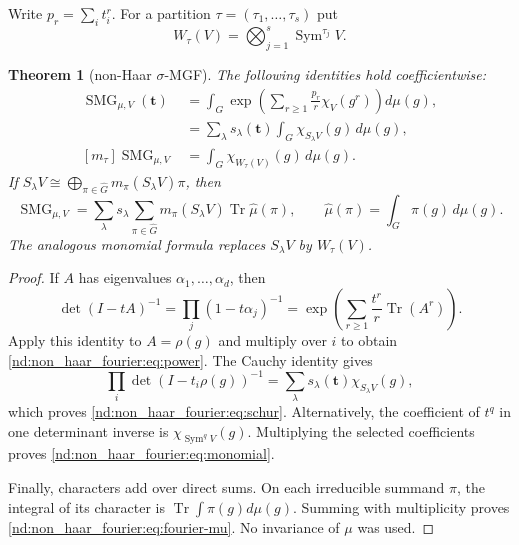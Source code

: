 \documentclass[10pt]{article}
\newcommand{\Sym}{\operatorname{Sym}}
\newcommand{\Tr}{\operatorname{Tr}}
\newcommand{\SMG}{\operatorname{SMG}}
\newcommand{\MGF}{\SMG}
\newtheorem{theorem}{Theorem}
\begin{document}
Write $p_r=\sum_i t_i^r$.  For a partition
$\tau=(\tau_1,\ldots,\tau_s)$ put
\begin{equation}\label{nd:non_haar_fourier:eq:wtau}
 W_\tau(V)=\bigotimes_{j=1}^s\Sym^{\tau_j}V.
\end{equation}

\begin{theorem}[non-Haar $\sigma$-MGF]\label{nd:non_haar_fourier:thm:master}
The following identities hold coefficientwise:
\begin{align}
 \MGF_{\mu,V}(\mathbf t)
 &=\int_G\exp\!\left(\sum_{r\ge1}\frac{p_r}{r}
     \chi_V(g^r)\right)d\mu(g),\label{nd:non_haar_fourier:eq:power}\\
 &=\sum_\lambda s_\lambda(\mathbf t)
     \int_G\chi_{S_\lambda V}(g)\,d\mu(g),\label{nd:non_haar_fourier:eq:schur}\\
 [m_\tau]\MGF_{\mu,V}
 &=\int_G\chi_{W_\tau(V)}(g)\,d\mu(g).\label{nd:non_haar_fourier:eq:monomial}
\end{align}
If
$S_\lambda V\cong\bigoplus_{\pi\in\widehat G}
m_\pi(S_\lambda V)\pi$, then
\begin{equation}\label{nd:non_haar_fourier:eq:fourier-mu}
 \boxed{\MGF_{\mu,V}
 =\sum_\lambda s_\lambda
   \sum_{\pi\in\widehat G}m_\pi(S_\lambda V)
        \Tr\widehat\mu(\pi),\qquad
 \widehat\mu(\pi)=\int_G\pi(g)\,d\mu(g).}
\end{equation}
The analogous monomial formula replaces $S_\lambda V$ by $W_\tau(V)$.
\end{theorem}

\begin{proof}
If $A$ has eigenvalues $\alpha_1,\ldots,\alpha_d$, then
\begin{equation}\label{nd:non_haar_fourier:eq:detexp}
 \det(I-tA)^{-1}
 =\prod_j(1-t\alpha_j)^{-1}
 =\exp\!\left(\sum_{r\ge1}\frac{t^r}{r}\Tr(A^r)\right).
\end{equation}
Apply this identity to $A=\rho(g)$ and multiply over $i$ to obtain
\eqref{nd:non_haar_fourier:eq:power}.  The Cauchy identity gives
\begin{equation}\label{nd:non_haar_fourier:eq:cauchy}
 \prod_i\det(I-t_i\rho(g))^{-1}
 =\sum_\lambda s_\lambda(\mathbf t)\chi_{S_\lambda V}(g),
\end{equation}
which proves \eqref{nd:non_haar_fourier:eq:schur}.  Alternatively, the coefficient of $t^q$ in
one determinant inverse is $\chi_{\Sym^qV}(g)$.  Multiplying the selected
coefficients proves \eqref{nd:non_haar_fourier:eq:monomial}.

Finally, characters add over direct sums.  On each irreducible summand $\pi$,
the integral of its character is $\Tr\int\pi(g)d\mu(g)$.  Summing with
multiplicity proves \eqref{nd:non_haar_fourier:eq:fourier-mu}.  No invariance of $\mu$ was used.
\end{proof}
\end{document}
